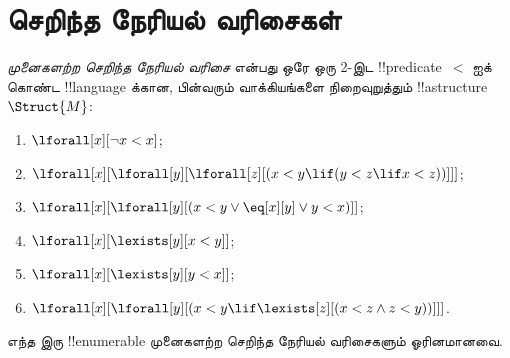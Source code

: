 \documentclass[../../../include/open-logic-section]{subfiles}
\begin{document}

\section{செறிந்த நேரியல் வரிசைகள்}

\begin{defn}
  \emph{முனைகளற்ற செறிந்த நேரியல் வரிசை} என்பது ஒரே ஒரு 2-இட
  !!{predicate}~$<$ ஐக் கொண்ட !!{language} க்கான, பின்வரும்
  வாக்கியங்களை நிறைவுறுத்தும் !!a{structure} $\Struct{M}$:
  \begin{enumerate}
  \item $\lforall[x][\lnot x < x]$;
  \item $\lforall[x][\lforall[y][\lforall[z][(x < y \lif (y < z \lif x
    <z ))]]]$;
  \item $\lforall[x][\lforall[y][(x< y \lor \eq[x][y] \lor y < x)]]$;
  \item $\lforall[x][\lexists[y][x < y]]$;
  \item $\lforall[x][\lexists[y][y < x]]$;
  \item $\lforall[x][\lforall[y][(x < y \lif \lexists[z][(x < z \land
        z < y))]]]$.
 \end{enumerate}
\end{defn}

\begin{thm}
  எந்த இரு !!{enumerable} முனைகளற்ற செறிந்த நேரியல் வரிசைகளும்
  ஓரினமானவை.
\end{thm}
\end{document}

